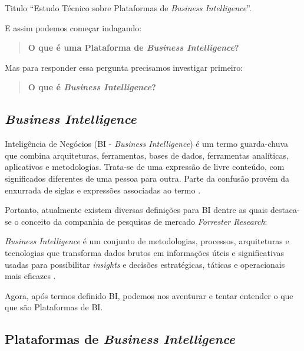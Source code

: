 \begin{env-destaque}{Titulo}
``Estudo Técnico sobre Plataformas de \emph{Business Intelligence}''. 
\end{env-destaque}

E assim podemos começar indagando:

\begin{quote}
\textbf{O que é uma Plataforma de \emph{Business Intelligence}?}
\end{quote}

Mas para responder essa pergunta precisamos investigar primeiro:

\begin{quote}
\textbf{O que é \emph{Business Intelligence}?}
\end{quote}

\subsection{\emph{Business Intelligence}}
\label{sub-bi}

Inteligência de Negócios (BI - \emph{Business Intelligence}) é um termo guarda-chuva que combina arquiteturas, ferramentas, bases de dados, ferramentas analíticas, aplicativos e metodologias. Trata-se de uma expressão de livre conteúdo, com significados diferentes de uma pessoa para outra. Parte da confusão provém da enxurrada de siglas e expressões associadas ao termo \cite{turban2019}. 

Portanto, atualmente existem diversas definições para BI dentre as quais destaca-se o conceito da companhia de pesquisas de mercado \emph{Forrester Research}:

\begin{definition}
\emph{Business Intelligence} é um conjunto de metodologias, processos, arquiteturas e tecnologias que transforma dados brutos em informações úteis e significativas usadas para possibilitar \emph{insights} e decisões estratégicas, táticas e operacionais mais eficazes \cite[tradução livre]{forrester:bi}.
\end{definition}

Agora, após termos definido BI, podemos nos aventurar e tentar entender o que que são Plataformas de BI.

\subsection{Plataformas de \emph{Business Intelligence}}
\label{sub-platbi}

